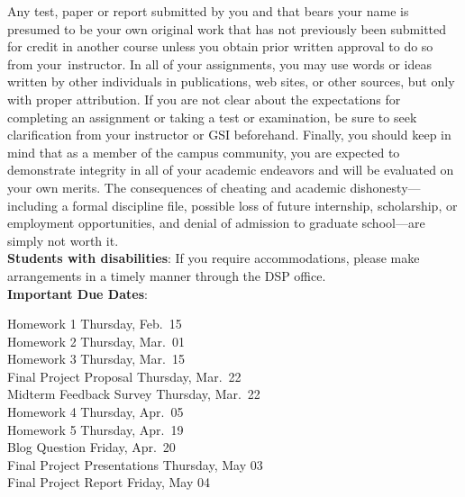 \documentclass[11pt]{article}
\begin{document}
Any test, paper or report submitted by you and that bears your name is presumed
to be your own original work that has not previously been submitted for credit
in another course unless you obtain prior written approval to do so from
your instructor. In all of your assignments, you may use words or ideas written
by other individuals in publications, web sites, or other sources, but only with
proper attribution. If you are not clear about the expectations for completing
an assignment or taking a test or examination, be sure to seek clarification
from your instructor or GSI beforehand. Finally, you should keep in mind that as
a member of the campus community, you are expected to demonstrate integrity in
all of your academic endeavors and will be evaluated on your own merits. The
consequences of cheating and academic dishonesty—including a formal discipline
file, possible loss of future internship, scholarship, or employment
opportunities, and denial of admission to graduate school—are simply not worth
it. \\

\textbf{Students with disabilities}: If you require accommodations, please make
arrangements in a timely manner through the DSP office.\\

\noindent\textbf{Important Due Dates}:
\begin{center} \begin{minipage}{5in}
\begin{flushleft}
Homework 1 \dotfill Thursday, Feb.~15\\
Homework 2 \dotfill Thursday, Mar.~01\\
Homework 3 \dotfill Thursday, Mar.~15\\
Final Project Proposal \dotfill Thursday, Mar.~22\\
Midterm Feedback Survey \dotfill Thursday, Mar.~22\\
Homework 4 \dotfill Thursday, Apr.~05\\
Homework 5 \dotfill Thursday, Apr.~19\\
Blog Question \dotfill Friday, Apr.~20\\
Final Project Presentations \dotfill Thursday, May 03\\
Final Project Report \dotfill Friday, May 04\\
\end{flushleft}
\end{minipage}
\end{center}

\newpage
\end{document}
